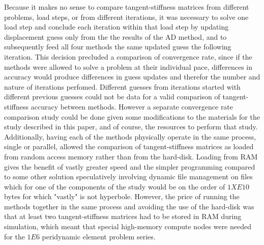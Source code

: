 \documentclass[preprint,12pt]{elsarticle}
\begin{document}
Because it makes no sense to compare tangent-stiffness matrices from different problems, load steps,
or from different iterations, it was necessary to solve one load step and conclude each iteration
within that load step by updating displacement guess only from the the results of the AD method, and
to subsequently feed all four methods the same updated guess the following iteration. This decision
precluded a comparison of convergence rate, since if the methods were allowed to solve a problem at
their individual pace, differences in accuracy would produce differences in guess updates and
therefor the number and nature of iterations perfomed. Different guesses from iterations started
with different previous guesses could not be data for a valid comparison of tangent-stiffness
accuracy between methods.  However a separate convergence rate comparison study could be done given
some modifications to the materials for the study described in this paper, and of course, the
resources to perform that study.   Additionally, having each of the methods physically operate in
the same process, single or parallel, allowed the comparison of tangent-stiffness matrices as loaded
from random access memory rather than from the hard-disk.  Loading from RAM gives the benefit of
vastly greater speed and the simpler programming compared to some other solution speculatively
involving dynamic file management on files which for one of the components of the study would be on
the order of $1XE10$ bytes for which "vastly" is not hyperbole. However, the price of running the
methods together in the same process and avoiding the use of the hard-disk was that at least two
tangent-stiffness matrices had to be stored in RAM during simulation, which meant that special
high-memory compute nodes were needed for the $1E6$ peridynamic element problem series.
\end{document}
